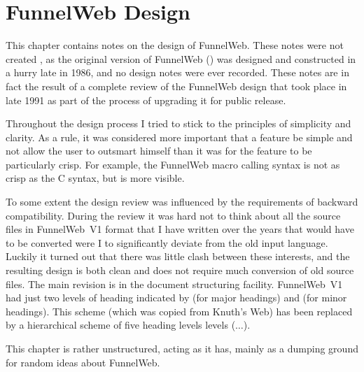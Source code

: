 %
%

\chapter{FunnelWeb Design}
\label{chapdesign}

This chapter contains notes on the design of FunnelWeb. These notes were
not created , as the original
version of FunnelWeb () was designed
and constructed in a hurry late in 1986, and no design notes were ever
recorded.
These notes are in fact the result of a complete review of the
FunnelWeb design that took place in late 1991 as part
of the process of upgrading it for public release.

Throughout the design process I tried to stick to the principles of
simplicity and clarity. As a rule, it was considered more important
that a feature be simple and not allow the user to outsmart himself than it
was for the feature to be particularly crisp. For example, the FunnelWeb
macro calling syntax is not as crisp as the C syntax, but is
more visible.

To some extent the design review was influenced by the requirements of
backward compatibility.
During the review it was hard not to think about
all the source files in FunnelWeb~V1 format that I have written over the
years that would have to be
converted were I to significantly deviate from the old input language.
Luckily it turned out that there was little clash between these
interests, and the resulting design is both clean and does not require
much conversion of old source files.
The main revision is in the document structuring facility.
FunnelWeb~V1 had just two levels of heading indicated by 
(for major headings) and
 (for minor headings). This scheme (which was copied from Knuth's
Web) has been replaced by a hierarchical scheme of five heading levels
levels ($\ldots$).

This chapter is rather unstructured, acting as it has, mainly as a
dumping ground for random ideas about FunnelWeb.

